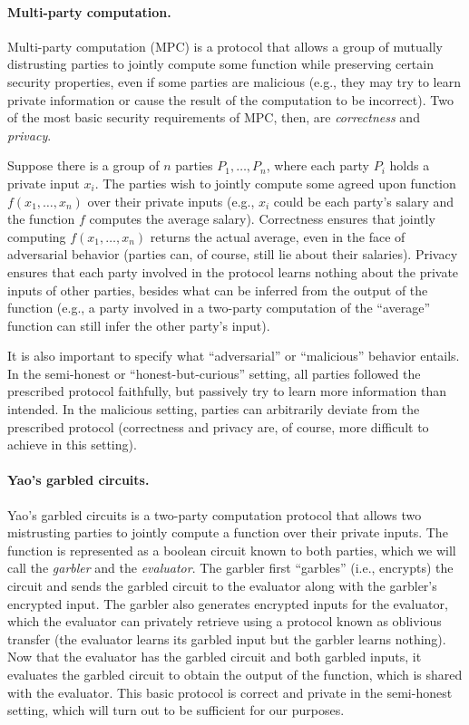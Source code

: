 \paragraph{Multi-party computation.}

Multi-party computation (MPC) is a protocol that allows a group of mutually
distrusting parties to jointly compute some function while preserving certain
security properties, even if some parties are malicious (e.g., they may try to
learn private information or cause the result of the computation to be
incorrect). Two of the most basic security requirements of MPC, then, are
\emph{correctness} and \emph{privacy}.

Suppose there is a group of $n$ parties $P_1, \ldots, P_n$, where each party
$P_i$ holds a private input $x_i$. The parties wish to jointly compute some
agreed upon function $f(x_1, \ldots, x_n)$ over their private inputs (e.g.,
$x_i$ could be each party's salary and the function $f$ computes the average
salary). Correctness ensures that jointly computing $f(x_1, \ldots, x_n)$
returns the actual average, even in the face of adversarial behavior (parties
can, of course, still lie about their salaries). Privacy ensures that each party
involved in the protocol learns nothing about the private inputs of other
parties, besides what can be inferred from the output of the function (e.g., a
party involved in a two-party computation of the ``average'' function can still
infer the other party's input).

It is also important to specify what ``adversarial'' or ``malicious'' behavior
entails. In the semi-honest or ``honest-but-curious'' setting, all parties
followed the prescribed protocol faithfully, but passively try to learn more
information than intended. In the malicious setting, parties can arbitrarily
deviate from the prescribed protocol (correctness and privacy are, of course,
more difficult to achieve in this setting).

\paragraph{Yao's garbled circuits.}
Yao's garbled circuits is a two-party computation protocol that allows two
mistrusting parties to jointly compute a function over their private inputs. The
function is represented as a boolean circuit known to both parties, which we
will call the \emph{garbler} and the \emph{evaluator}. The garbler first
``garbles'' (i.e., encrypts) the circuit and sends the garbled circuit to the
evaluator along with the garbler's encrypted input. The garbler also generates
encrypted inputs for the evaluator, which the evaluator can privately retrieve
using a protocol known as oblivious transfer (the evaluator learns its garbled
input but the garbler learns nothing). Now that the evaluator has the garbled
circuit and both garbled inputs, it evaluates the garbled circuit to obtain the
output of the function, which is shared with the evaluator. This basic protocol
is correct and private in the semi-honest setting, which will turn out to be
sufficient for our purposes.

